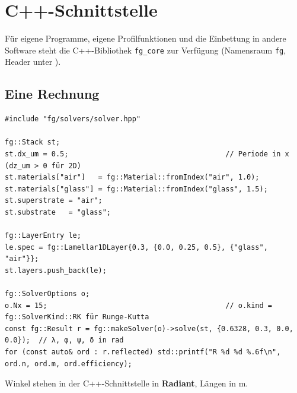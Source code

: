 \chapter{C++-Schnittstelle}\label{ch:cpp}
%

Für eigene Programme, eigene Profilfunktionen und die Einbettung in andere Software steht die C++-Bibliothek
\texttt{fg\_core} zur Verfügung (Namensraum \texttt{fg}, Header unter ).

\section{Eine Rechnung}
\begin{lstlisting}[style=cpp]
#include "fg/solvers/solver.hpp"

fg::Stack st;
st.dx_um = 0.5;                                     // Periode in x (dz_um > 0 für 2D)
st.materials["air"]   = fg::Material::fromIndex("air", 1.0);
st.materials["glass"] = fg::Material::fromIndex("glass", 1.5);
st.superstrate = "air";
st.substrate   = "glass";

fg::LayerEntry le;
le.spec = fg::Lamellar1DLayer{0.3, {0.0, 0.25, 0.5}, {"glass", "air"}};
st.layers.push_back(le);

fg::SolverOptions o;
o.Nx = 15;                                          // o.kind = fg::SolverKind::RK für Runge-Kutta
const fg::Result r = fg::makeSolver(o)->solve(st, {0.6328, 0.3, 0.0, 0.0});  // λ, φ, ψ, δ in rad
for (const auto& ord : r.reflected) std::printf("R %d %d %.6f\n", ord.n, ord.m, ord.efficiency);
\end{lstlisting}
Winkel stehen in der C++-Schnittstelle in \textbf{Radiant}, Längen in \textmu m.

